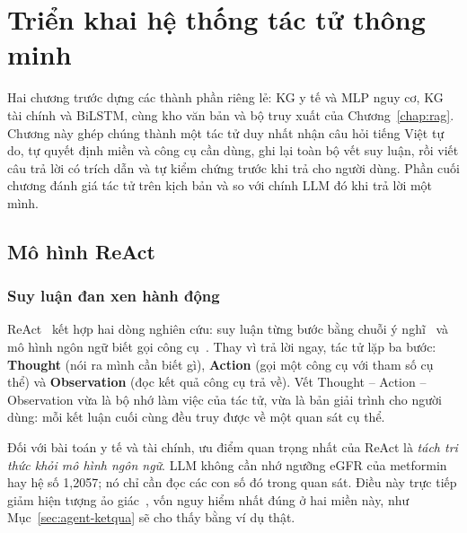 \chapter{Triển khai hệ thống tác tử thông minh}\label{chap:agent}

Hai chương trước dựng các thành phần riêng lẻ: KG y tế và MLP nguy cơ, KG tài chính và BiLSTM, cùng kho văn bản và
bộ truy xuất của Chương~\ref{chap:rag}. Chương này ghép chúng thành một tác tử duy nhất nhận câu hỏi tiếng Việt tự
do, tự quyết định miền và công cụ cần dùng, ghi lại toàn bộ vết suy luận, rồi viết câu trả lời có trích dẫn và tự
kiểm chứng trước khi trả cho người dùng. Phần cuối chương đánh giá tác tử trên  kịch bản và so
với chính LLM đó khi trả lời một mình.

\section{Mô hình ReAct}\label{sec:react}
\subsection{Suy luận đan xen hành động}
ReAct~\cite{yao2023react} kết hợp hai dòng nghiên cứu: suy luận từng bước bằng chuỗi ý nghĩ~\cite{wei2022cot} và mô
hình ngôn ngữ biết gọi công cụ~\cite{schick2023toolformer}. Thay vì trả lời ngay, tác tử lặp ba bước:
\textbf{Thought} (nói ra mình cần biết gì), \textbf{Action} (gọi một công cụ với tham số cụ thể) và
\textbf{Observation} (đọc kết quả công cụ trả về). Vết Thought -- Action -- Observation vừa là bộ nhớ làm việc của
tác tử, vừa là bản giải trình cho người dùng: mỗi kết luận cuối cùng đều truy được về một quan sát cụ thể.


Đối với bài toán y tế và tài chính, ưu điểm quan trọng nhất của ReAct là \emph{tách tri thức khỏi mô hình ngôn
ngữ}. LLM không cần nhớ ngưỡng eGFR của metformin hay hệ số 1,2057; nó chỉ cần đọc các con số đó trong quan sát. Điều
này trực tiếp giảm hiện tượng ảo giác~\cite{ji2023hallucination}, vốn nguy hiểm nhất đúng ở hai miền này, như
Mục~\ref{sec:agent-ketqua} sẽ cho thấy bằng ví dụ thật.

